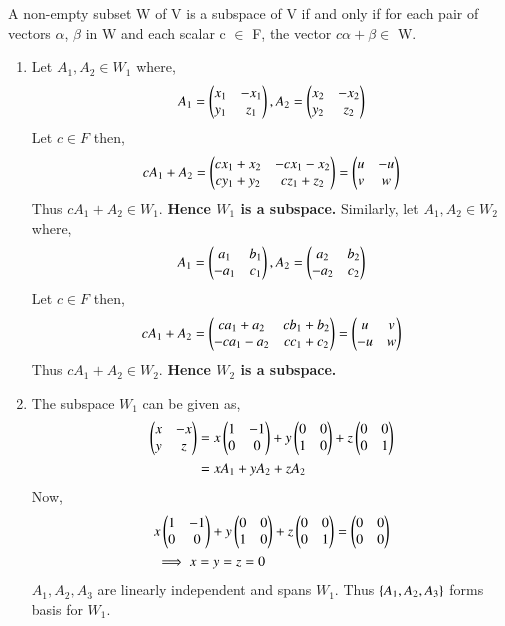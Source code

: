 A non-empty subset W of V is a subspace of V if and only if for each pair of vectors $\alpha$, $\beta$ in W and each scalar c $\in$ F, the vector $c\alpha+\beta \in$ W.

\begin{enumerate}
\item Let ${A_1,A_2}\in W_1$ where,
\begin{align}
    A_1 = \begin{pmatrix}x_1&-x_1\\y_1&z_1\end{pmatrix}, A_2 = \begin{pmatrix}x_2&-x_2\\y_2&z_2\end{pmatrix}
\end{align}
Let $c\in F$ then,
\begin{align}
    cA_1+A_2 = \begin{pmatrix}cx_1+x_2&-cx_1-x_2\\cy_1+y_2&cz_1+z_2\end{pmatrix} = \begin{pmatrix}u&-u\\v&w\end{pmatrix}
\end{align}
Thus $cA_1+A_2 \in W_1$. \textbf{Hence $W_1$ is a subspace.} 
Similarly, let ${A_1,A_2}\in W_2$ where,
\begin{align}
    A_1 = \begin{pmatrix}a_1&b_1\\-a_1&c_1\end{pmatrix}, A_2 = \begin{pmatrix}a_2&b_2\\-a_2&c_2\end{pmatrix}
\end{align}
Let $c\in F$ then,
\begin{align}
    cA_1+A_2 = \begin{pmatrix}ca_1+a_2&cb_1+b_2\\-ca_1-a_2&cc_1+c_2\end{pmatrix} = \begin{pmatrix}u&v\\-u&w\end{pmatrix}
\end{align}
Thus $cA_1+A_2 \in W_2$. \textbf{Hence $W_2$ is a subspace.}

\item The subspace $W_1$ can be given as, 
\begin{align}
    \begin{pmatrix}x&-x\\y&z\end{pmatrix} &= x\begin{pmatrix}1&-1\\0&0\end{pmatrix} + y\begin{pmatrix}0&0\\1&0\end{pmatrix} + z\begin{pmatrix}0&0\\0&1\end{pmatrix} \\
    &= xA_1 + yA_2 + zA_2 \label{eq:solutions/2/3/7/span_w1}
\end{align}
Now, 
\begin{align}
    &x\begin{pmatrix}1&-1\\0&0\end{pmatrix} + y\begin{pmatrix}0&0\\1&0\end{pmatrix} + z\begin{pmatrix}0&0\\0&1\end{pmatrix} = \begin{pmatrix}0&0\\0&0\end{pmatrix} \\
    &\implies x = y = z = 0 \label{eq:solutions/2/3/7/indep_w1}
\end{align}
$A_1, A_2, A_3$ are linearly independent and spans $W_1$. Thus $\left\{A_1, A_2, A_3\right\}$ forms basis for $W_1$. 


\end{enumerate}
